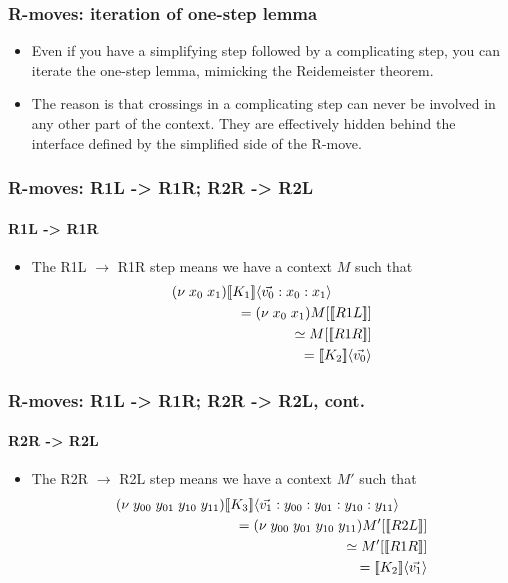 \documentclass{beamer}
\begin{document}
\begin{frame}
  \frametitle{R-moves: iteration of one-step lemma} 
  \begin{itemize}
  \item Even if you have a simplifying step followed by a complicating
    step, you can iterate the one-step lemma, mimicking the
    Reidemeister theorem.

  \item The reason is that crossings in a complicating step can never
    be involved in any other part of the context. They are effectively
    hidden behind the interface defined by the simplified side of the
    R-move.
\end{itemize}
\end{frame}

\begin{frame}
  \frametitle{R-moves: R1L -> R1R; R2R -> R2L} 
  \framesubtitle{R1L -> R1R}
  \begin{itemize}
   \item The R1L $\to$ R1R step means we have a context $M$ such that
     \begin{eqnarray}
       (\nu \; x_0 \; x_1)\lefteqn{\meaningof{K_{1}}\langle \vec{v_0}:x_0 : x_1 \rangle} \nonumber \\
       & & = (\nu \; x_0 \; x_1)M[ \meaningof{R1L} ] \nonumber \\
       & & \simeq M[ \meaningof{R1R} ] \nonumber \\
       & & = \meaningof{K_{2}}\langle \vec{v_0} \rangle \nonumber
     \end{eqnarray}
   \end{itemize}
 \end{frame}

 \begin{frame}
   \frametitle{R-moves: R1L -> R1R; R2R -> R2L, cont.} 
   \framesubtitle{R2R -> R2L}
   \begin{itemize}
   \item The R2R $\to$ R2L step means we have a context $M'$ such that
     \begin{eqnarray}
       (\nu \; y_{00} \; y_{01} \; y_{10} \; y_{11})\lefteqn{\meaningof{K_{3}}\langle \vec{v_1}:y_{00} : y_{01} : y_{10} : y_{11} \rangle} \nonumber \\
       & & = (\nu \; y_{00} \; y_{01} \; y_{10} \; y_{11})M'[ \meaningof{R2L} ] \nonumber \\
       & & \simeq M'[ \meaningof{R1R} ] \nonumber \\
       & & = \meaningof{K_{2}}\langle \vec{v_1} \rangle \nonumber
     \end{eqnarray}
   \end{itemize}
 \end{frame}
\end{document}

